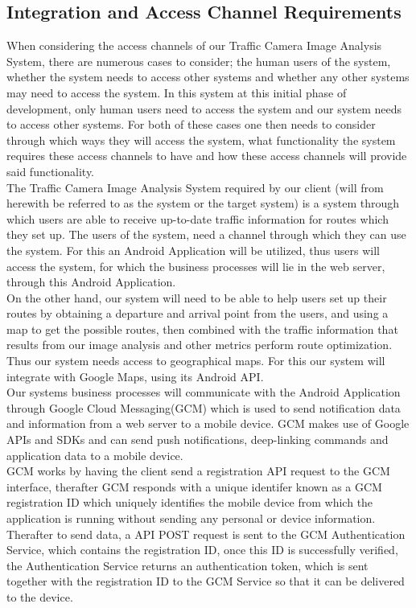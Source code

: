 \documentclass[a4paper,12pt]{article}
\begin{document}
\subsection{Integration and Access Channel Requirements}
When considering the access channels of our Traffic Camera Image Analysis System, there are numerous cases to consider; the human users of the system, whether the system  needs to access other systems and whether any other systems may need to access the system. In this system at this initial phase of development, only human users need to access the system and our system needs to access other systems. For both of these cases one then needs to consider through which ways they will access the system, what functionality the system requires these access channels to have and how these access channels will provide said functionality. \\
 
The Traffic Camera Image Analysis System required by our client (will from herewith be referred to as the system or the target system) is a system through which users are able to receive up-to-date traffic information for routes which they set up. The users of the system, need a channel through which they can use the system. For this an Android Application will be utilized, thus users will access the system, for which the business processes will lie in the web server, through this Android Application. \\

On the other hand, our system will need to be able to help users set up their routes by obtaining a departure and arrival point from the users, and using a map to get the possible routes, then combined with the traffic information that results from our image analysis and other metrics perform route optimization. Thus our system needs access to geographical maps. For this our system will integrate with Google Maps, using its Android API.\\

Our systems business processes will communicate with the Android Application through Google Cloud Messaging(GCM) which is used to send notification data and information from a web server to a mobile device. GCM makes use of Google APIs and SDKs and can send push notifications, deep-linking commands and application data to a mobile device. \\
GCM works by having the client send a registration API request to the GCM interface, therafter GCM responds with a unique identifer known as a GCM registration ID which uniquely identifies the mobile device from which the application is running without sending any personal or device information. Therafter to send data, a API POST request is sent to the GCM Authentication Service, which contains the registration ID, once this ID is successfully verified, the Authentication Service returns an authentication token, which is sent together with the registration ID to the GCM Service so that it can be delivered to the device. \\
\end{document}
